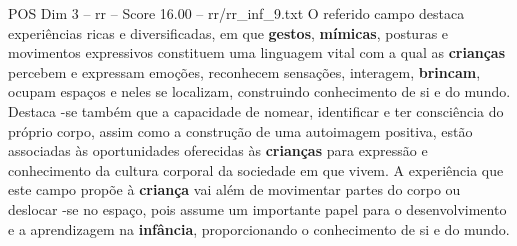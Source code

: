 \begin{textsample}{POS Dim 3 – rr – Score 16.00 – rr/rr\_inf\_9.txt}
O referido campo destaca experiências ricas e diversificadas, em que \textbf{gestos}, \textbf{mímicas}, posturas e movimentos expressivos constituem uma linguagem vital com a qual as \textbf{crianças} percebem e expressam emoções, reconhecem sensações, interagem, \textbf{brincam}, ocupam espaços e neles se localizam, construindo conhecimento de si e do mundo.
Destaca -se também que a capacidade de nomear, identificar e ter consciência do próprio corpo, assim como a construção de uma autoimagem positiva, estão associadas às oportunidades oferecidas às \textbf{crianças} para expressão e conhecimento da cultura corporal da sociedade em que vivem.
A experiência que este campo propõe à \textbf{criança} vai além de movimentar partes do corpo ou deslocar -se no espaço, pois assume um importante papel para o desenvolvimento e a aprendizagem na \textbf{infância}, proporcionando o conhecimento de si e do mundo.

\end{textsample}
